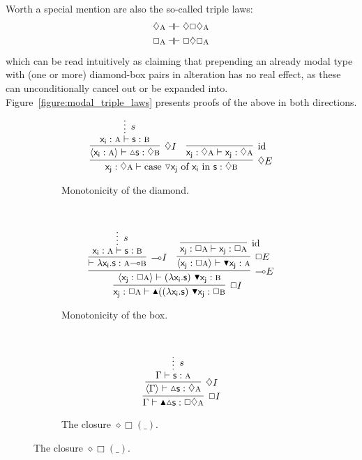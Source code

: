 Worth a special mention are also the so-called triple laws:
\begin{align*}
	\diamond\prop{A} \dashv\vdash \diamond\Box\diamond\prop{A}\\
	\Box\prop{A} \dashv\vdash \Box\diamond\Box\prop{A}
\end{align*}
which can be read intuitively as claiming that prepending an already modal type with (one or more) diamond-box pairs in alteration has no real effect, as these can unconditionally cancel out or be expanded into.
Figure~\ref{figure:modal_triple_laws} presents proofs of the above in both directions.

\begin{figure}
	\centering
	\begin{subfigure}{1\textwidth}
		\[
			\infer[\diamond E]{\term{x_j}: \diamond \prop{A} \vdash  \cterm{case \term{\diaelim x_j} of \term{x_i } in \term{s}}: \diamond \prop{B}}{
					\infer[\diamond I]{\bracket{\term{x_i }: \prop{A}} \vdash \diaintro \term{s}: \diamond \prop{B}}{
						\infer*[s]{\term{x_i }: \prop{A} \vdash \term{s}: \prop{B}}{}
					}
					&
					\infer[\Ax]{\term{x_j}: \diamond \prop{A} \vdash \term{x_j}: \diamond \prop{A}}{}
			}
		\]
		\caption{Monotonicity of the diamond.}
		\label{subfigure:modal_properties:diamond_mono}
	\end{subfigure}\\[\midsep]
	\begin{subfigure}{1\textwidth}
		\[
			\infer[\Box I]{\term{x_j}: \Box \prop{A} \vdash \boxintro{((\term{\lambda x_i .s})~\term{\boxelim x_j}}:\Box \prop{B}}{
				\infer[\li E]{\bracket{\term{x_j}: \Box \prop{A}} \vdash (\term{\lambda x_i .s})~\term{\boxelim x_j}: \prop{B}}{
					\infer[\li I]{\vdash \term{\lambda x_i .s}: \prop{A} \li\prop{B}}{
						\infer*[s]{\term{x_i }: \prop{A} \vdash \term{s}: \prop{B}}{}
					}
					&
					\infer[\Box E]{\bracket{\term{x_j}: \Box \prop{A}} \vdash \boxelim\term{x_j}:\prop{A}}{	
						\infer[\Ax]{\term{x_j}: \Box\prop{A} \vdash \term{x_j}: \Box\prop{A}}{}
					}
				}
			}
		\]
		\caption{Monotonicity of the box.}
		\label{subfigure:modal_properties:box_mono}
	\end{subfigure}\\[\midsep]
	\begin{subfigure}{0.4\textwidth}
		\[
		\infer[\Box I]{\Gamma \vdash \boxintro\diaintro\term{s}:\Box \diamond \prop{A}}{
			\infer[\diamond I]{\bracket{\Gamma} \vdash \diaintro\term{s}: \diamond \prop{A}}{
				\infer*[s]{\Gamma \vdash \term{s}: \prop{A}}{}
			}
		}
		\]
		\caption{The closure $\diamond\Box(\_)$.}

\end{subfigure}
\end{figure}

